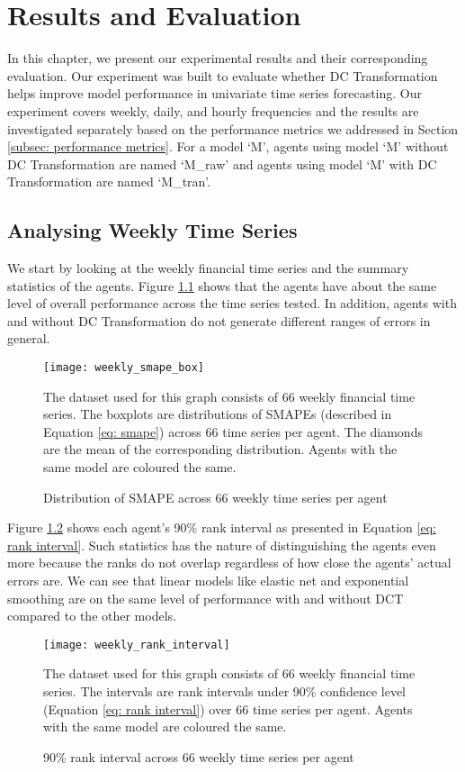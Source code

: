 \chapter{Results and Evaluation}\label{ch: results and eval}
In this chapter, we present our experimental results and their corresponding evaluation. Our experiment was built to evaluate whether DC Transformation helps improve model performance in univariate time series forecasting. Our experiment covers weekly, daily, and hourly frequencies and the results are investigated separately based on the performance metrics we addressed in Section \ref{subsec: performance metrics}. For a model `M', agents using model `M' without DC Transformation are named `M\_raw' and agents using model `M' with DC Transformation are named `M\_tran'.

\section{Analysing Weekly Time Series}
We start by looking at the weekly financial time series and the summary statistics of the agents. Figure \ref{fig: weekly smape box} shows that the agents have about the same level of overall performance across the time series tested. In addition, agents with and without DC Transformation do not generate different ranges of errors in general.
\begin{figure}[H]
    \centering
    \texttt{[image: weekly\_smape\_box]}
    \caption{Distribution of SMAPE across $66$ weekly time series per agent}
    {\raggedright \footnotesize The dataset used for this graph consists of $66$ weekly financial time series. The boxplots are distributions of SMAPEs (described in Equation \ref{eq: smape}) across $66$ time series per agent. The diamonds are the mean of the corresponding distribution. Agents with the same model are coloured the same. \par}
    \label{fig: weekly smape box}
\end{figure}
Figure \ref{fig: weekly rank interval} shows each agent's 90\% rank interval as presented in Equation \ref{eq: rank interval}. Such statistics has the nature of distinguishing the agents even more because the ranks do not overlap regardless of how close the agents' actual errors are. We can see that linear models like elastic net and exponential smoothing are on the same level of performance with and without DCT compared to the other models.
\begin{figure}[H]
    \centering
    \texttt{[image: weekly\_rank\_interval]}
    \caption{90\% rank interval across $66$ weekly time series per agent}
    {\raggedright \footnotesize The dataset used for this graph consists of $66$ weekly financial time series. The intervals are rank intervals under 90\% confidence level (Equation \ref{eq: rank interval}) over $66$ time series per agent. Agents with the same model are coloured the same. \par}
    \label{fig: weekly rank interval}
\end{figure}
